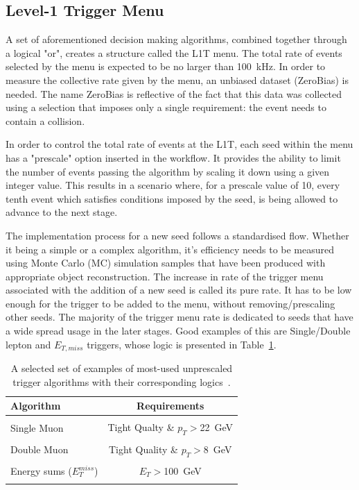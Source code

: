 \subsection{Level-1 Trigger Menu}

\hspace{10pt} A set of aforementioned decision making algorithms, combined together through a logical "or", creates a structure called the L1T menu. The total rate of events selected by the menu is expected to be no larger than 100~kHz. In order to measure the collective rate given by the menu, an unbiased dataset (ZeroBias) is needed. The name ZeroBias is reflective of the fact that this data was collected using a selection that imposes only a single requirement: the event needs to contain a collision. 

\hspace{10pt}In order to control the total rate of events at the L1T, each seed within the menu has a "prescale" option inserted in the workflow. It provides the ability to limit the number of events passing the algorithm by scaling it down using a given integer value. This results in a scenario where, for a prescale value of 10, every tenth event which satisfies conditions imposed by the seed, is being allowed to advance to the next stage. 

\hspace{10pt} The implementation process for a new seed follows a standardised flow. Whether it being a simple or a complex algorithm, it's efficiency needs to be measured using Monte Carlo (MC) simulation samples that have been produced with appropriate object reconstruction. The increase in rate of the trigger menu associated with the addition of a new seed is called its pure rate. It has to be low enough for the trigger to be added to the menu, without removing/prescaling other seeds. The majority of the trigger menu rate is dedicated to seeds that have a wide spread usage in the later stages. Good examples of this are Single/Double lepton and $E_{T,miss}$ triggers, whose logic is presented in Table~\ref{tab:l1_triggers}. 

\begin{table}[htbp]
    \centering
    \begin{tabular}{lc}
     Algorithm & Requirements \\   \hline\hline
           & \\
      Single Muon   &  Tight Qualty \& $p_T>$22~GeV \\
                 & \\
      Double Muon  &  Tight Quality \& $p_T>$8~GeV  \\
                 & \\
      Energy sums ($E_{T}^{miss}$) & $E_{T}>$100~GeV \\
      & \\\hline\hline
    \end{tabular}
    \caption{A selected set of examples of most-used unprescaled trigger algorithms with their corresponding logics~\cite{cms:l1_paper}.}
    \label{tab:l1_triggers}
\end{table}


